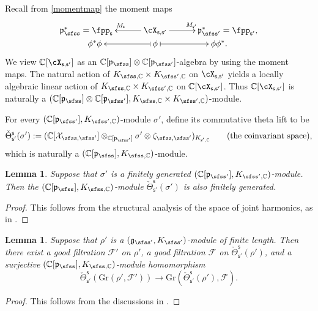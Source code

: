 \documentclass[12pt,a4paper]{amsart}
\newcommand{\CF}{{\mathcal {F}}}
\newcommand{\CX}{{\mathcal {X}}}
\newcommand{\oS}{\operatorname{S}}
\newcommand{\g}{\mathfrak g}
\newcommand{\p}{\mathfrak p}
\numberwithin{equation}{section}
\newtheorem{lem}[thm]{Lemma}
\theoremstyle{remark}
\begin{document}
Recall from \eqref{momentmap} the moment maps
  \[
    \xymatrix@R=0em@C=3.0em{
     \p_\sfss^*=\fpp_\mathsf s &\ar[l]_{M_\mathsf s} \cX_{\mathsf s, \mathsf s'}\ar[r]^{M_{\mathsf s'}}& \p_{\sfss'}^*=\fpp_{\mathsf s'},\\
    \qquad \phi^* \phi  &\ar@{|->}[l] \phi \ar@{|->}[r] & \phi \phi^*.\qquad
    }
  \]
We view $\C[\cX_{\mathsf s, \mathsf s'}]$ as an $\C[\p_\sfss]\otimes \C[\p_{\sfss'}]$-algebra by using the moment maps. The natural action of $K_{\sfss,\C}\times K_{\sfss',\C}$ on $\cX_{\mathsf s, \mathsf s'}$ yields a locally algebraic linear action of  $K_{\sfss,\C}\times K_{\sfss',\C}$ on $\C[\cX_{\mathsf s, \mathsf s'}]$. Thus $\C[\cX_{\mathsf s, \mathsf s'}]$  is naturally a  $(\C[\p_{\sfss}]\otimes \C[\p_{\sfss'}], K_{\sfss, \C}\times K_{\sfss', \C})$-module.

For every  $(\C[\p_{\sfss'}], K_{\sfss', \C})$-module $\sigma'$, define its commutative theta lift to be
\[
   \check \Theta_{\mathsf s'}^{\mathsf s}(\sigma'):=(\C[\CX_{\sfss, \sfss'}]\otimes_{\C[\p_{\sfss'}]} \sigma'\otimes \zeta_{\sfss, \sfss'})_{K_{\mathsf s', \C}} \qquad (\textrm{the  coinvariant space}),
\]
which is naturally a  $(\C[\p_{\sfss}], K_{\sfss, \C})$-module.

\begin{lem}
Suppose that $\sigma'$ is a finitely generated  $(\C[\p_{\sfss'}], K_{\sfss', \C})$-module. Then the  $(\C[\p_{\sfss}], K_{\sfss, \C})$-module   $\check \Theta_{\mathsf s'}^{\mathsf s}(\sigma')$ is also finitely generated.
\end{lem}
\begin{proof} This follows from the structural analysis of the space of joint harmonics, as in \cite[Section 4]{Howe89}. 
\end{proof}

\begin{lem}\label{lm}
Suppose that $\rho'$ is a  $(\g_{\sfss'}, K_{\sfss'})$-module of finite length. Then there exist a good filtration $\CF'$ on $\rho'$, a good filtration $\CF$ on $\check \Theta_{\mathsf s'}^{\mathsf s}(\rho')$, and a surjective $(\C[\p_{\sfss}], K_{\sfss, \C})$-module homomorphism
\[
  \check \Theta_{\mathsf s'}^{\mathsf s}(\mathrm{Gr}(\rho',\CF')) \rightarrow \mathrm{Gr}(\check \Theta_{\mathsf s'}^{\mathsf s}(\rho'),\CF).
\]
\end{lem}
\begin{proof} This follows from the discussions in \cite[Section 3.2]{LM}.
\end{proof}
\end{document}
